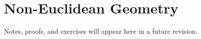\section{Non-Euclidean Geometry}

\begin{remark*}[Status]
Notes, proofs, and exercises will appear here in a future revision.
\end{remark*}